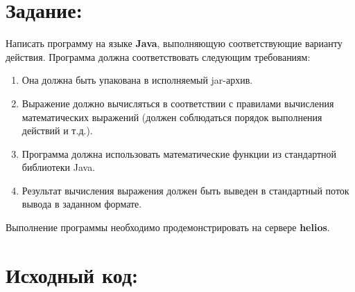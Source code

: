 \documentclass[11pt]{article}
\begin{document}
\section{Задание:}
\label{sec:org2a7f4e0}
Написать программу на языке \textbf{Java}, выполняющую соответствующие варианту действия. Программа должна соответствовать следующим требованиям:
\begin{enumerate}
\item Она должна быть упакована в исполняемый jar-архив.
\item Выражение должно вычисляться в соответствии с правилами вычисления матема\-тических выражений (должен соблюдаться порядок выполнения действий и т.д.).
\item Программа должна использовать математические функции из стандартной биб\-лиотеки Java.
\item Результат вычисления выражения должен быть выведен в стандартный поток вывода в заданном формате.
\end{enumerate}
Выполнение программы необходимо продемонстрировать на сервере \textbf{helios}.

\vspace{2em}
\section{Исходный код:}
\label{sec:org4fbc547}
\end{document}
